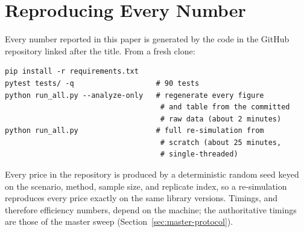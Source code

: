 \documentclass[sigconf]{acmart}
\begin{document}



\appendix
\section{Reproducing Every Number}
Every number reported in this paper is generated by the code in the GitHub
repository linked after the title. From a fresh clone:
\begin{verbatim}
pip install -r requirements.txt
pytest tests/ -q                   # 90 tests
python run_all.py --analyze-only   # regenerate every figure
                                    # and table from the committed
                                    # raw data (about 2 minutes)
python run_all.py                  # full re-simulation from
                                    # scratch (about 25 minutes,
                                    # single-threaded)
\end{verbatim}
Every price in the repository is produced by a deterministic random seed
keyed on the scenario, method, sample size, and replicate index, so a
re-simulation reproduces every price exactly on the same library versions.
Timings, and therefore efficiency numbers, depend on the machine; the
authoritative timings are those of the master sweep
(Section~\ref{sec:master-protocol}).
\end{document}
